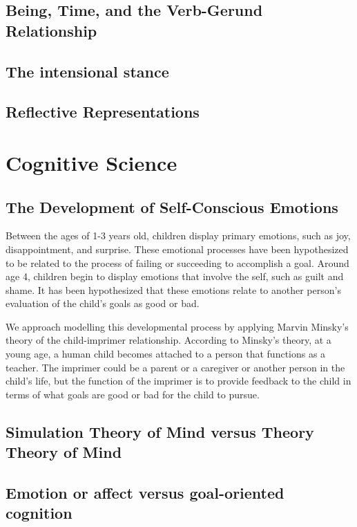\subsection{Being, Time, and the Verb-Gerund Relationship}

\subsection{The intensional stance}

\subsection{Reflective Representations}

\citep{perner:1991}


\section{Cognitive Science}


\subsection{The Development of Self-Conscious Emotions}

Between the ages of 1-3 years old, children display primary emotions,
such as joy, disappointment, and surprise.  These emotional processes
have been hypothesized to be related to the process of failing or
succeeding to accomplish a goal.  Around age 4, children begin to
display emotions that involve the self, such as guilt and shame.  It
has been hypothesized that these emotions relate to another person's
evaluation of the child's goals as good or bad.

We approach modelling this developmental process by applying Marvin
Minsky's theory of the child-imprimer relationship.  According to
Minsky's theory, at a young age, a human child becomes attached to a
person that functions as a teacher.  The imprimer could be a parent or
a caregiver or another person in the child's life, but the function of
the imprimer is to provide feedback to the child in terms of what
goals are good or bad for the child to pursue.

\subsection{Simulation Theory of Mind versus Theory Theory of Mind}


\subsection{Emotion or affect versus goal-oriented cognition}



